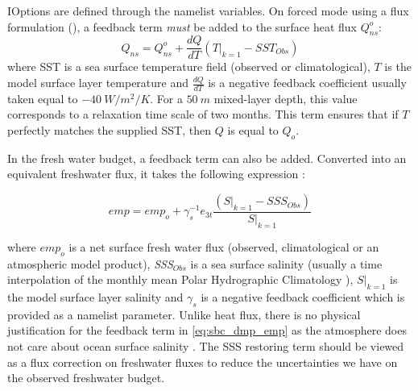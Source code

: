 \documentclass[../tex_main/NEMO_manual]{subfiles}
\begin{document}

IOptions are defined through the  namelist variables.
On forced mode using a flux formulation (),
a feedback term \emph{must} be added to the surface heat flux $Q_{ns}^o$:
\begin{equation} \label{eq:sbc_dmp_q}
Q_{ns} = Q_{ns}^o + \frac{dQ}{dT} \left( \left. T \right|_{k=1} - SST_{Obs} \right)
\end{equation}
where SST is a sea surface temperature field (observed or climatological),
$T$ is the model surface layer temperature and
$\frac{dQ}{dT}$ is a negative feedback coefficient usually taken equal to $-40~W/m^2/K$.
For a $50~m$ mixed-layer depth, this value corresponds to a relaxation time scale of two months. 
This term ensures that if $T$ perfectly matches the supplied SST, then $Q$ is equal to $Q_o$. 

In the fresh water budget, a feedback term can also be added.
Converted into an equivalent freshwater flux, it takes the following expression :

\begin{equation} \label{eq:sbc_dmp_emp}
\textit{emp} = \textit{emp}_o + \gamma_s^{-1} e_{3t}  \frac{  \left(\left.S\right|_{k=1}-SSS_{Obs}\right)}
												         {\left.S\right|_{k=1}}
\end{equation}

where $\textit{emp}_{o }$ is a net surface fresh water flux
(observed, climatological or an atmospheric model product),
\textit{SSS}$_{Obs}$ is a sea surface salinity
(usually a time interpolation of the monthly mean Polar Hydrographic Climatology \citep{Steele2001}),
$\left.S\right|_{k=1}$ is the model surface layer salinity and
$\gamma_s$ is a negative feedback coefficient which is provided as a namelist parameter.
Unlike heat flux, there is no physical justification for the feedback term in \autoref{eq:sbc_dmp_emp} as
the atmosphere does not care about ocean surface salinity \citep{Madec1997}.
The SSS restoring term should be viewed as a flux correction on freshwater fluxes to
reduce the uncertainties we have on the observed freshwater budget.

\end{document}
